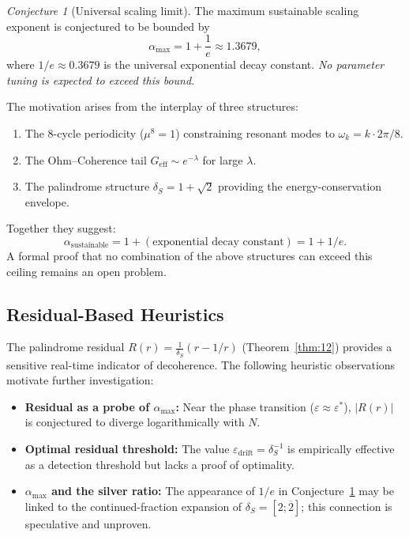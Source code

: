 \documentclass[12pt,a4paper]{article}
\theoremstyle{plain}
\theoremstyle{definition}
\theoremstyle{remark}
\newtheorem{conjecture}[theorem]{Conjecture}
\newcommand{\abs}[1]{\lvert #1 \rvert}
\newcommand{\dS}{\delta_S}        %
\newcommand{\Geff}{G_{\mathrm{eff}}}
\begin{document}
\begin{conjecture}[Universal scaling limit]\label{conj:universal}
  The maximum sustainable scaling exponent is conjectured to be bounded by
  \begin{equation}
    \alpha_{\max} = 1 + \frac{1}{e} \approx 1.3679,
    \label{eq:alpha-max}
  \end{equation}
  where $1/e \approx 0.3679$ is the universal exponential decay constant.
  \emph{No parameter tuning is expected to exceed this bound.}
\end{conjecture}

\noindent
The motivation arises from the interplay of three structures:
\begin{enumerate}
  \item The 8-cycle periodicity ($\mu^8=1$) constraining resonant modes to
    $\omega_k = k\cdot 2\pi/8$.
  \item The Ohm--Coherence tail $\Geff \sim e^{-\lambda}$ for large $\lambda$.
  \item The palindrome structure $\dS = 1+\sqrt{2}$ providing the
    energy-conservation envelope.
\end{enumerate}
Together they suggest:
\begin{equation}
  \alpha_{\mathrm{sustainable}} = 1 + (\text{exponential decay constant}) = 1 + 1/e.
  \label{eq:alpha-derivation}
\end{equation}
A formal proof that no combination of the above structures can exceed this
ceiling remains an open problem.

\subsection{Residual-Based Heuristics}

The palindrome residual $R(r) = \frac{1}{\dS}(r - 1/r)$ (Theorem~\ref{thm:12})
provides a sensitive real-time indicator of decoherence.  The following
heuristic observations motivate further investigation:
\begin{itemize}
  \item \textbf{Residual as a probe of $\alpha_{\max}$:} Near the phase
    transition ($\varepsilon \approx \varepsilon^*$), $\abs{R(r)}$ is
    conjectured to diverge logarithmically with $N$.
  \item \textbf{Optimal residual threshold:} The value
    $\varepsilon_{\mathrm{drift}} = \dS^{-1}$ is empirically effective as a
    detection threshold but lacks a proof of optimality.
  \item \textbf{$\alpha_{\max}$ and the silver ratio:} The appearance of
    $1/e$ in Conjecture~\ref{conj:universal} may be linked to the
    continued-fraction expansion of $\dS = [2;\overline{2}]$; this
    connection is speculative and unproven.
\end{itemize}
\end{document}
